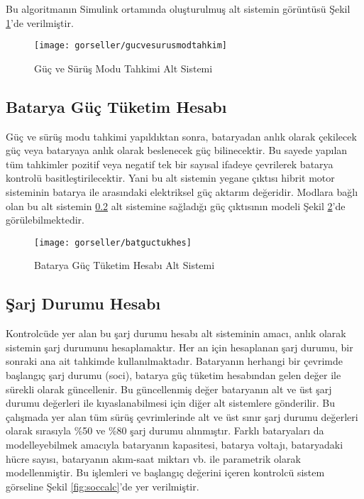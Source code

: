 Bu algoritmanın Simulink ortamında oluşturulmuş alt sistemin görüntüsü Şekil \ref{fig:gucvesurusmodtahkim}'de verilmiştir. 

\begin{figure}[h]
    \centering
    \texttt{[image: gorseller/gucvesurusmodtahkim]}
    \caption{Güç ve Sürüş Modu Tahkimi Alt Sistemi}\label{fig:gucvesurusmodtahkim}
\end{figure}

\subsection{Batarya Güç Tüketim Hesabı}
\label{bataryaguctuketimhesabikismi}

Güç ve sürüş modu tahkimi yapıldıktan sonra, bataryadan anlık olarak çekilecek güç veya bataryaya anlık olarak beslenecek güç bilinecektir. Bu sayede yapılan tüm tahkimler pozitif veya negatif tek bir sayısal ifadeye çevrilerek
batarya kontrolü basitleştirilecektir. Yani bu alt sistemin yegane çıktısı hibrit motor sisteminin batarya ile arasındaki elektriksel güç aktarım değeridir.
Modlara bağlı olan bu alt sistemin \ref{sarjdurumuhesabikismi} alt sistemine sağladığı güç çıktısının modeli Şekil \ref{fig:batguctukhes}'de görülebilmektedir.

\begin{figure}[h]
    \centering
    \texttt{[image: gorseller/batguctukhes]}
    \caption{Batarya Güç Tüketim Hesabı Alt Sistemi}\label{fig:batguctukhes}
\end{figure}

\subsection{Şarj Durumu Hesabı}
\label{sarjdurumuhesabikismi}

Kontrolcüde yer alan bu şarj durumu hesabı alt sisteminin amacı, anlık olarak sistemin şarj durumunu hesaplamaktır. Her an için hesaplanan şarj durumu, bir sonraki ana ait tahkimde kullanılmaktadır.
Bataryanın herhangi bir çevrimde başlangıç şarj durumu (\acrshort{soci}), batarya güç tüketim hesabından gelen değer ile sürekli olarak güncellenir. Bu güncellenmiş değer bataryanın alt ve üst şarj durumu değerleri ile kıyaslanabilmesi için
diğer alt sistemlere gönderilir. Bu çalışmada yer alan tüm sürüş çevrimlerinde alt ve üst sınır şarj durumu değerleri olarak sırasıyla \%50 ve \%80 şarj durumu alınmıştır. Farklı bataryaları da modelleyebilmek amacıyla
bataryanın kapasitesi, batarya voltajı, bataryadaki hücre sayısı, bataryanın akım-saat miktarı vb. ile parametrik olarak modellenmiştir. Bu işlemleri ve başlangıç değerini içeren kontrolcü sistem
görseline Şekil \ref{fig:soccalc}'de yer verilmiştir.

